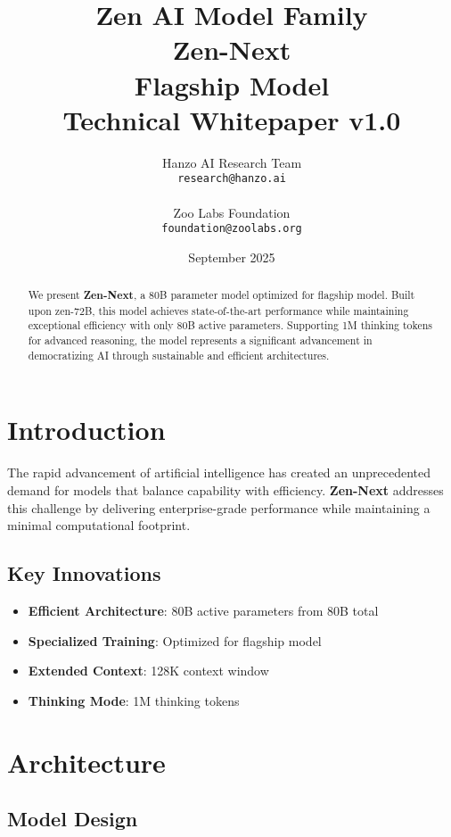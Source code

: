 \documentclass[11pt,a4paper]{article}
\title{
    \vspace{-2cm}
    \Large \textbf{Zen AI Model Family} \\
    \vspace{0.5cm}
    \Huge \textbf{Zen-Next} \\
    \vspace{0.3cm}
    \large Flagship Model \\
    \vspace{0.5cm}
    \normalsize Technical Whitepaper v1.0
}
\author{
    Hanzo AI Research Team \\
    \texttt{research@hanzo.ai} \\
    \\
    Zoo Labs Foundation \\
    \texttt{foundation@zoolabs.org}
}
\date{September 2025}
\begin{document}
\maketitle

\begin{abstract}
We present \textbf{Zen-Next}, a 80B parameter model optimized for flagship model. 
Built upon zen-72B, this model achieves state-of-the-art performance while maintaining exceptional efficiency 
with only 80B active parameters. Supporting 1M thinking tokens for advanced reasoning, the model represents a significant advancement in democratizing AI through sustainable and efficient architectures.
\end{abstract}

\tableofcontents
\newpage

\section{Introduction}

The rapid advancement of artificial intelligence has created an unprecedented demand for models that balance capability with efficiency. 
\textbf{Zen-Next} addresses this challenge by delivering enterprise-grade performance while maintaining a minimal computational footprint.

\subsection{Key Innovations}
\begin{itemize}
    \item \textbf{Efficient Architecture}: 80B active parameters from 80B total
    \item \textbf{Specialized Training}: Optimized for flagship model
    \item \textbf{Extended Context}: 128K context window
    \item \textbf{Thinking Mode}: 1M thinking tokens
    
    
\end{itemize}

\section{Architecture}

\subsection{Model Design}
\end{document}
